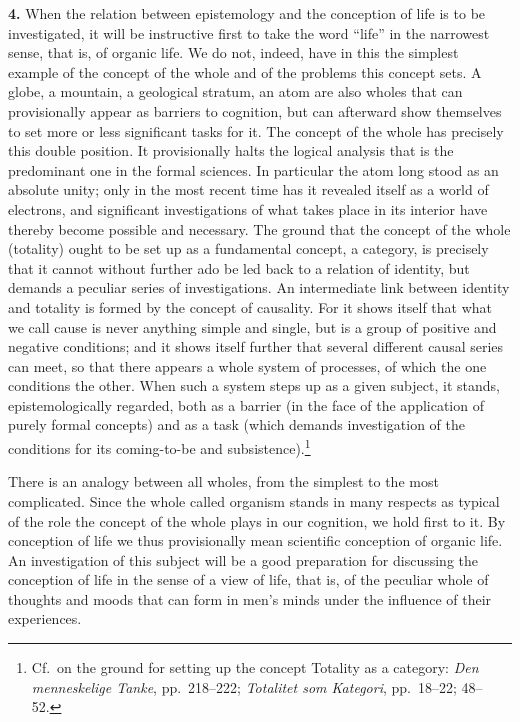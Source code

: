 \documentclass[12pt]{book}
\newcommand{\hnum}[1]{\textbf{#1.}\enspace}
\newcommand{\opage}[1]{\marginnote{\footnotesize\textit{[#1]}}}
\begin{document}
\opage{21}\hnum{4} When the relation between epistemology and the conception of life is to be investigated,
it will be instructive first to take the word ``life'' in the narrowest sense, that is, of organic
life. We do not, indeed, have in this the simplest example of the concept of the whole and of the
problems this concept sets. A globe, a mountain, a geological stratum, an atom are also wholes that
can provisionally appear as barriers to cognition, but can afterward show themselves to set more or
less significant tasks for it. The concept of the whole has precisely this double position. It
provisionally halts the logical analysis that is the predominant one in the formal sciences. In
particular the atom long stood as an absolute unity; only in the most recent time has it revealed
itself as a world of electrons, and significant investigations of what takes place in its interior
have thereby become possible and necessary. The ground that the concept of the whole (totality)
ought to be set up as a fundamental concept, a category, is precisely that it cannot without
further ado be led back to a relation of identity, but demands a peculiar series of investigations.
An intermediate link between identity and totality is formed by the concept of causality. For it
shows itself that what we call cause is never anything simple and single, but is a group of
positive and negative conditions; and it shows itself further that several different causal series
can meet, so that there \opage{22}appears a whole system of processes, of which the one conditions the other.
When such a system steps up as a given subject, it stands, epistemologically regarded, both as a
barrier (in the face of the application of purely formal concepts) and as a task (which demands
investigation of the conditions for its coming-to-be and subsistence).\footnote{Cf.\ on the ground
for setting up the concept Totality as a category: \textit{Den menneskelige Tanke}, pp.\ 218--222;
\textit{Totalitet som Kategori}, pp.\ 18--22; 48--52.}

There is an analogy between all wholes, from the simplest to the most complicated. Since the whole
called organism stands in many respects as typical of the role the concept of the whole plays in
our cognition, we hold first to it. By conception of life we thus provisionally mean scientific
conception of organic life. An investigation of this subject will be a good preparation for
discussing the conception of life in the sense of a view of life, that is, of the peculiar whole of
thoughts and moods that can form in men's minds under the influence of their experiences.
\end{document}
